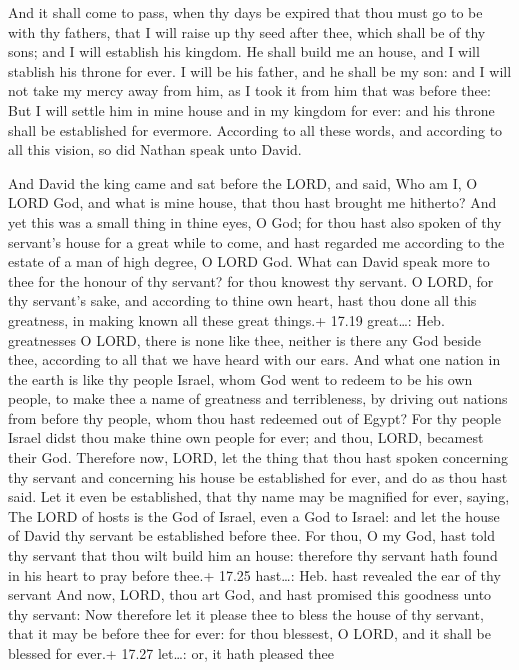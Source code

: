  And it shall come to pass, when thy days be expired that
thou must go to be with thy fathers, that I will raise up thy seed after
thee, which shall be of thy sons; and I will establish his kingdom.
 He shall build me an house, and I will stablish his throne
for ever.  I will be his father, and he shall be my son:
and I will not take my mercy away from him, as I took it from him that
was before thee:  But I will settle him in mine house and
in my kingdom for ever: and his throne shall be established for
evermore.  According to all these words, and according to
all this vision, so did Nathan speak unto David.

 And David the king came and sat before the LORD, and
said, Who am I, O LORD God, and what is mine house, that thou hast
brought me hitherto?  And yet this was a small thing in
thine eyes, O God; for thou hast also spoken of thy servant's house for
a great while to come, and hast regarded me according to the estate of a
man of high degree, O LORD God.  What can David speak more
to thee for the honour of thy servant? for thou knowest thy servant.
 O LORD, for thy servant's sake, and according to thine own
heart, hast thou done all this greatness, in making known all these
great things.+ 17.19 great\ldots: Heb. greatnesses  O LORD,
there is none like thee, neither is there any God beside thee, according
to all that we have heard with our ears.  And what one
nation in the earth is like thy people Israel, whom God went to redeem
to be his own people, to make thee a name of greatness and terribleness,
by driving out nations from before thy people, whom thou hast redeemed
out of Egypt?  For thy people Israel didst thou make thine
own people for ever; and thou, LORD, becamest their God. 
Therefore now, LORD, let the thing that thou hast spoken concerning thy
servant and concerning his house be established for ever, and do as thou
hast said.  Let it even be established, that thy name may
be magnified for ever, saying, The LORD of hosts is the God of Israel,
even a God to Israel: and let the house of David thy servant be
established before thee.  For thou, O my God, hast told thy
servant that thou wilt build him an house: therefore thy servant hath
found in his heart to pray before thee.+ 17.25 hast\ldots: Heb. hast
revealed the ear of thy servant  And now, LORD, thou art
God, and hast promised this goodness unto thy servant:  Now
therefore let it please thee to bless the house of thy servant, that it
may be before thee for ever: for thou blessest, O LORD, and it shall be
blessed for ever.+ 17.27 let\ldots: or, it hath pleased thee

